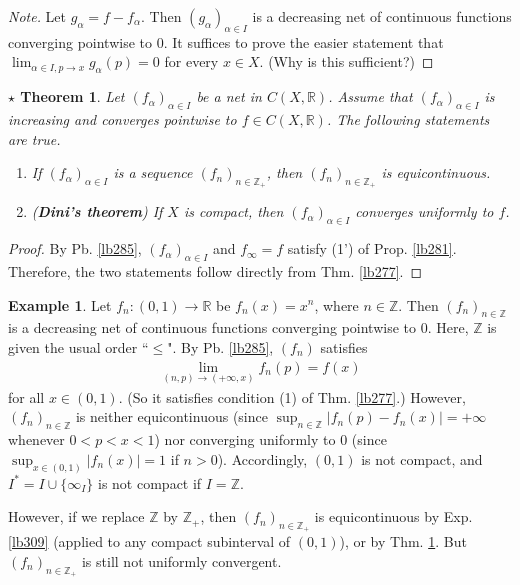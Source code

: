 \documentclass[12pt,b5paper,notitlepage]{article}
\theoremstyle{definition}
\newtheorem{eg}[df]{Example}
\theoremstyle{plain}
\newtheorem{sthm}[df]{$\star$ Theorem}
\newcommand{\Zbb}{\mathbb Z}
\newcommand{\Rbb}{\mathbb R}
\newcommand{\dps}{\displaystyle}
\numberwithin{equation}{section}
\begin{document}
\begin{proof}[Note]
Let $g_\alpha=f-f_\alpha$. Then $(g_\alpha)_{\alpha\in I}$ is a decreasing net of continuous functions converging pointwise to $0$. It suffices to prove the easier statement that $\dps\lim_{\alpha\in I,p\rightarrow x}g_\alpha(p)=0$ for every $x\in X$. (Why is this sufficient?)
\end{proof}

\begin{sthm}\label{lb286}
Let $(f_\alpha)_{\alpha\in I}$ be a net in $C(X,\Rbb)$. Assume that $(f_\alpha)_{\alpha\in I}$ is increasing and converges pointwise to $f\in C(X,\Rbb)$. The following statements are true.
\begin{enumerate}
\item If $(f_\alpha)_{\alpha\in I}$ is a sequence $(f_n)_{n\in\Zbb_+}$, then $(f_n)_{n\in\Zbb_+}$ is equicontinuous.
\item (\textbf{Dini's theorem})  If $X$ is compact, then $(f_\alpha)_{\alpha\in I}$ converges uniformly to $f$.
\end{enumerate}
\end{sthm}


\begin{proof}
By Pb. \ref{lb285}, $(f_\alpha)_{\alpha\in I}$ and $f_\infty=f$ satisfy (1') of Prop. \ref{lb281}. Therefore, the two statements follow directly from Thm. \ref{lb277}.
\end{proof}


\begin{eg}\label{lb401}
Let $f_n:(0,1)\rightarrow \Rbb$ be $f_n(x)=x^n$, where $n\in\Zbb$. Then $(f_n)_{n\in\Zbb}$ is a decreasing net of continuous functions converging pointwise to $0$. Here, $\Zbb$ is given the usual order ``$\leq$". By Pb. \ref{lb285}, $(f_n)$ satisfies
\begin{align*}
\lim_{(n,p)\rightarrow(+\infty,x)
}f_n(p)=f(x)
\end{align*}
for all $x\in (0,1)$. (So it satisfies condition (1) of Thm. \ref{lb277}.) However, $(f_n)_{n\in\Zbb}$ is neither equicontinuous (since $\sup_{n\in\Zbb}|f_n(p)-f_n(x)|=+\infty$ whenever $0<p<x<1$) nor converging uniformly to $0$ (since $\sup_{x\in (0,1)}|f_n(x)|=1$ if $n>0$). Accordingly, $(0,1)$ is not compact, and $I^*=I\cup\{\infty_I\}$ is not compact if $I=\Zbb$. 

However, if we replace $\Zbb$ by $\Zbb_+$, then $(f_n)_{n\in\Zbb_+}$ is equicontinuous by Exp. \ref{lb309} (applied to any compact subinterval of $(0,1)$), or by Thm. \ref{lb286}. But $(f_n)_{n\in\Zbb_+}$ is still not uniformly convergent. 
 \hfill\qedsymbol
\end{eg}
\end{document}
